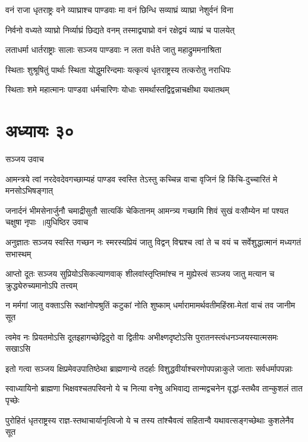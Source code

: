 \twolineshloka
{वनं राजा धृतराष्ट्रः वने व्याघ्राश्च पाण्डवाः}
{मा वनं छिन्धि सव्याघ्रं व्याघ्रा नेशुर्वनं विना}


\twolineshloka
{निर्वनो वध्यते व्याघ्रो निर्व्याघ्रं छिद्यते वनम्}
{तस्माद्व्याघ्रो वनं रक्षेद्वयं व्याघ्रं च पालयेत्}


\twolineshloka
{लताधर्मा धार्तराष्ट्राः सालाः सञ्जय पाण्डवाः}
{न लता वर्धते जातु महाद्रुममनाश्रिता}


\twolineshloka
{स्थिताः शुश्रूषितुं पार्थाः स्थिता योद्धुमरिन्दमाः}
{यत्कृत्यं धृतराष्ट्रस्य तत्करोतु नराधिपः}


\twolineshloka
{स्थिताः शमे महात्मानः पाण्डवा धर्मचारिणः}
{योधाः समर्थास्तद्विद्वन्नाचक्षीथा यथातथम्}


\chapter{अध्यायः ३०}
\twolineshloka
{सञ्जय उवाच}
{}


\twolineshloka
{आमन्त्रये त्वां नरदेवदेवगच्छाम्यहं पाण्डव स्वस्ति तेऽस्तु}
{कच्चिन्न वाचा वृजिनं हि किंचि-दुच्चारितं मे मनसोऽभिषङ्गात्}


\threelineshloka
{जनार्दनं भीमसेनार्जुनौ चमाद्रीसुतौ सात्यकिं चेकितानम्}
{आमन्त्र्य गच्छामि शिवं सुखं वःसौम्येन मां पश्यत चक्षुषा नृपाः ॥युधिष्ठिर उवाच}
{}


\twolineshloka
{अनुज्ञातः सञ्जय स्वस्ति गच्छन नः स्मरस्यप्रियं जातु विद्वन्}
{विद्मश्च त्वां ते च वयं च सर्वेशुद्धात्मानं मध्यगतं सभास्थम्}


\twolineshloka
{आप्तो दूतः सञ्जय सुप्रियोऽसिकल्याणवाक् शीलवांस्तृप्तिमांश्च}
{न मुह्येस्त्वं सञ्जय जातु मत्यान च क्रुद्ध्येरुच्यमानोऽपि तत्त्वम्}


\twolineshloka
{न मर्मगां जातु वक्ताऽसि रूक्षांनोपश्रुतिं कटुकां नोति शुष्काम्}
{धर्मारामामर्थवतीमहिंस्रा-मेतां वाचं तव जानीम सूत}


\twolineshloka
{त्वमेव नः प्रियतमोऽसि दूतइहागच्छेद्विदुरो वा द्वितीयः}
{अभीक्ष्णदृष्टोऽसि पुरातनस्त्वंधनञ्जयस्यात्मसमः सखाऽसि}


\twolineshloka
{इतो गत्वा सञ्जय क्षिप्रमेवउपातिष्ठेथा ब्राह्मणान्ये तदर्हाः}
{विशुद्धवीर्याश्चरणोपपन्नाःकुले जाताः सर्वधर्मापपन्नाः}


\twolineshloka
{स्वाध्यायिनो ब्राह्मणा भिक्षवश्चतपस्विनो ये च नित्या वनेषु}
{अभिवाद्य तान्मद्वचनेन वृद्धां-स्तथैव तान्कुशलं तात पृच्छेः}


\twolineshloka
{पुरोहितं धृतराष्ट्रस्य राज्ञ-स्तथाचार्यानृत्विजो ये च तस्य}
{तांश्चैवत्वं सहितान्वै यथावत्सङ्गच्छेथाः कुशलेनैव सूत}



